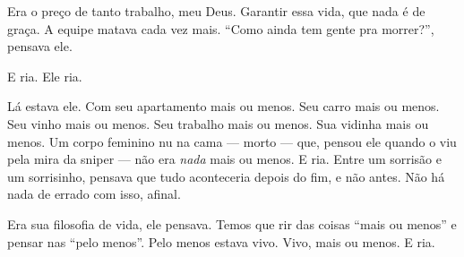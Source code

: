 Era o preço de tanto trabalho, meu Deus. Garantir essa vida, que nada é de graça. A equipe matava cada vez mais. ``Como ainda tem gente pra morrer?'', pensava ele.

E ria. Ele ria.

Lá estava ele. Com seu apartamento mais ou menos. Seu carro mais ou menos. Seu vinho mais ou menos. Seu trabalho mais ou menos. Sua vidinha mais ou menos. Um corpo feminino nu na cama --- morto --- que, pensou ele quando o viu pela mira da sniper --- não era \emph{nada} mais ou menos. E ria. Entre um sorrisão e um sorrisinho, pensava que tudo aconteceria depois do fim, e não antes. Não há nada de errado com isso, afinal.

Era sua filosofia de vida, ele pensava. Temos que rir das coisas ``mais ou menos'' e pensar nas ``pelo menos''. Pelo menos estava vivo. Vivo, mais ou menos. E ria.
